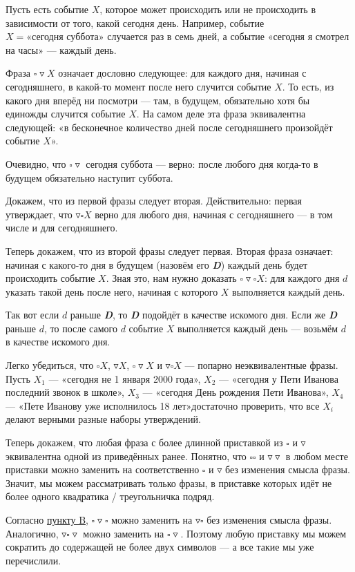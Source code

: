 \noindent Пусть есть событие $X$, которое может происходить или не происходить в зависимости от того, какой сегодня день. Например, событие $X = \text{«сегодня суббота»}$ случается раз в семь дней, а событие «сегодня я смотрел на часы» — каждый день. 

\def\sq{\square}
\def\td{\triangledown}

\begin{itemize}
\itA Фраза $\sq\td X$ означает дословно следующее: для каждого дня, начиная с сегодняшнего, в какой-то момент после него случится событие $X$. То есть, из какого дня вперёд ни посмотри — там, в будущем, обязательно хотя бы единожды случится событие $X$. На самом деле эта фраза эквивалентна следующей: «в бесконечное количество дней после сегодняшнего произойдёт событие $X$».

Очевидно, что $\sq\td \text{ сегодня суббота}$ — верно: после любого дня когда-то в будущем обязательно наступит суббота.

\itB \label{logicb} Докажем, что из первой фразы следует вторая. Действительно: первая утверждает, что $\td\sq X$ верно для любого дня, начиная с сегодняшнего — в том числе и для сегодняшнего.

Теперь докажем, что из второй фразы следует первая. Вторая фраза означает: начиная с какого-то дня в будущем (назовём его {\itshape\bfseries D}) каждый день будет происходить событие $X$. Зная это, нам нужно доказать $\sq\td\sq X$: для каждого дня $d$ указать такой день после него, начиная с которого $X$ выполняется каждый день.

Так вот если $d$ раньше {\itshape\bfseries D}, то {\itshape\bfseries D} подойдёт в качестве искомого дня. Если же {\itshape\bfseries D} раньше $d$, то после самого $d$ событие $X$ выполняется каждый день — возьмём $d$ в качестве искомого дня.

\itC Легко убедиться, что $\sq X$, $\td X$, $\sq\td X$ и $\td\sq X$ — попарно неэквивалентные фразы. Пусть $X_1$ — «сегодня не 1 января 2000 года», $X_2$ — «сегодня у Пети Иванова последний звонок в школе», $X_3$ — «сегодня День рождения Пети Иванова», $X_4$ — «Пете Иванову уже исполнилось 18 лет»\scolon достаточно проверить, что все $X_i$ делают верными разные наборы утверждений.

Теперь докажем, что любая фраза с более длинной приставкой из $\sq$ и $\td$ эквивалентна одной из приведённых ранее. Понятно, что $\sq\sq$ и $\td\td$ в любом месте приставки можно заменить на соответственно $\sq$ и $\td$ без изменения смысла фразы. Значит, мы можем рассматривать только фразы, в приставке которых идёт не более одного квадратика / треугольничка подряд.

Согласно \hyperref[logicb]{пункту B}, $\sq\td\sq$ можно заменить на $\td\sq$ без изменения смысла фразы. Аналогично, $\td\sq\td$ можно заменить на $\sq\td$. Поэтому любую приставку мы можем сократить до содержащей не более двух символов — а все такие мы уже перечислили.

\end{itemize}